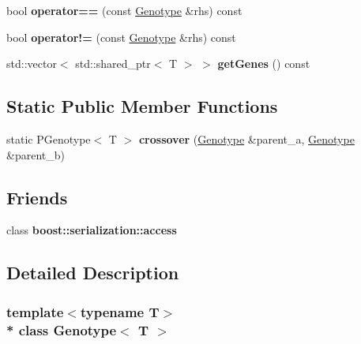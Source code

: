 \begin{DoxyCompactItemize}
\item 
bool {\bfseries operator==} (const \hyperlink{classGenotype}{Genotype} \&rhs) const \hypertarget{classGenotype_a6b7de41bb91479adc030ee4db3a5aab7}{}\label{classGenotype_a6b7de41bb91479adc030ee4db3a5aab7}

\item 
bool {\bfseries operator!=} (const \hyperlink{classGenotype}{Genotype} \&rhs) const \hypertarget{classGenotype_a9969a19f352b79c2abc10188306071fa}{}\label{classGenotype_a9969a19f352b79c2abc10188306071fa}

\item 
std\+::vector$<$ std\+::shared\+\_\+ptr$<$ T $>$ $>$ {\bfseries get\+Genes} () const \hypertarget{classGenotype_a34bd58f011f915e034ae6b3aea4fd54c}{}\label{classGenotype_a34bd58f011f915e034ae6b3aea4fd54c}

\end{DoxyCompactItemize}
\subsection*{Static Public Member Functions}
\begin{DoxyCompactItemize}
\item 
static P\+Genotype$<$ T $>$ {\bfseries crossover} (\hyperlink{classGenotype}{Genotype} \&parent\+\_\+a, \hyperlink{classGenotype}{Genotype} \&parent\+\_\+b)\hypertarget{classGenotype_a97906c12a2b40c984cb264ee75381f66}{}\label{classGenotype_a97906c12a2b40c984cb264ee75381f66}

\end{DoxyCompactItemize}
\subsection*{Friends}
\begin{DoxyCompactItemize}
\item 
class {\bfseries boost\+::serialization\+::access}\hypertarget{classGenotype_ac98d07dd8f7b70e16ccb9a01abf56b9c}{}\label{classGenotype_ac98d07dd8f7b70e16ccb9a01abf56b9c}

\end{DoxyCompactItemize}


\subsection{Detailed Description}
\subsubsection*{template$<$typename T$>$\\*
class Genotype$<$ T $>$}

